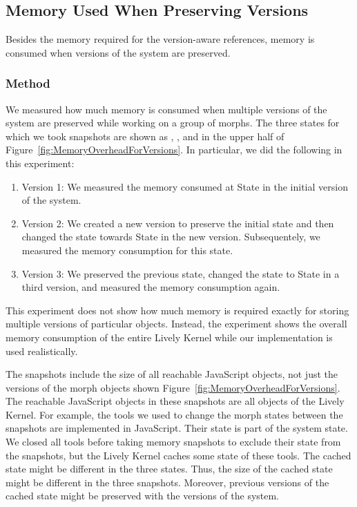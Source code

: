 \subsection{Memory Used When Preserving Versions}

Besides the memory required for the version-aware references, memory is consumed when versions of the system are preserved.

\subsubsection{Method}
We measured how much memory is consumed when multiple versions of the system are preserved while working on a group of morphs.
The three states for which we took snapshots are shown as , , and  in the upper half of Figure~\ref{fig:MemoryOverheadForVersions}.
In particular, we did the following in this experiment:
\begin{enumerate}
    \item Version 1: We measured the memory consumed at State  in the initial version of the system.
    \item Version 2: We created a new version to preserve the initial state and then changed the state towards State  in the new version. Subsequentely, we measured the memory consumption for this state.
    \item Version 3: We preserved the previous state, changed the state to State  in a third version, and measured the memory consumption again.
\end{enumerate}

This experiment does not show how much memory is required exactly for storing multiple versions of particular objects.
Instead, the experiment shows the overall memory consumption of the entire Lively Kernel while our implementation is used realistically.

The snapshots include the size of all reachable JavaScript objects, not just the versions of the morph objects shown Figure~\ref{fig:MemoryOverheadForVersions}.
The reachable JavaScript objects in these snapshots are all objects of the Lively Kernel.
For example, the tools we used to change the morph states between the snapshots are implemented in JavaScript.
Their state is part of the system state.\\
We closed all tools before taking memory snapshots to exclude their state from the snapshots, but the Lively Kernel caches some state of these tools.
The cached state might be different in the three states.
Thus, the size of the cached state might be different in the three snapshots.
Moreover, previous versions of the cached state might be preserved with the versions of the system.

